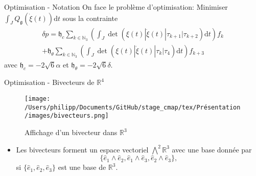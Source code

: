 \documentclass[10pt, envcountsect]{beamer}
\theoremstyle{plain}
\newcommand{\N}{\mathbb{N}}
\newcommand{\R}{\mathbb{R}}
\newcommand{\dd}[1]{\mathrm{d}#1}
\begin{document}
\begin{frame}{Optimisation - Notation}
On face le problème d'optimisation:
Minimiser $ \int_{J} Q_{\mathfrak{g}}(\dot{\xi}(t)) \dd t$ sous la contrainte
\begin{align}
\label{eq: constraint}
\delta p = \mathfrak{h}_{c} \sum_{k \in \N_3}\left ( \int_{J} \det( \xi(t) | \dot{\xi}(t) | \tau_{k+1} | \tau_{k+2}) \dd t \right ) f_k\\
	+ \mathfrak{h}_{\theta}  \sum_{k \in \N_3}\left ( \int_{J} \det ( \xi(t) | \dot{\xi}(t) | \tau_{k} | \tau_{4}) \dd t\right ) f_{k + 3} \nonumber
\end{align}
avec $\mathfrak{h}_c = - 2 \sqrt{6} \alpha$ et $\mathfrak{h}_{\theta} = - 2 \sqrt{6} \delta$.
\end{frame}


\begin{frame}{Optimisation - Bivecteurs de $\R^4$}
\begin{figure}[h]
\center
\texttt{[image: /Users/philipp/Documents/GitHub/stage\_cmap/tex/Présentation/images/bivecteurs.png]}
\caption{Affichage d'un bivecteur dans $\R^3$ \cite{Lounesto2006}}
\end{figure}
\begin{itemize}
\item Les bivecteurs forment un espace vectoriel $\bigwedge^2 \R^3$ avec une base donnée par
\begin{equation}
 \{\hat{e}_1 \wedge \hat{e}_2, \hat{e}_1 \wedge \hat{e}_3, \hat{e}_2 \wedge \hat{e}_3\},
\end{equation}
si $\{\hat{e}_1, \hat{e}_2, \hat{e}_3\}$ est une base de $\R^3$.
\end{itemize}
\end{frame}
\end{document}
